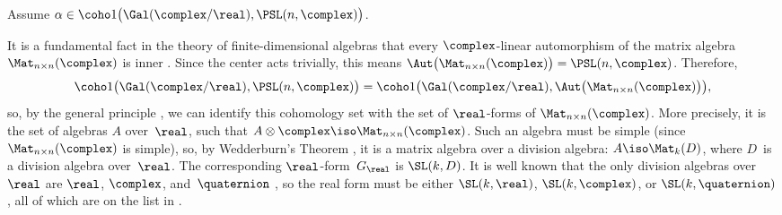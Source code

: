 \begin{case} \label{RFormFromCoho-innerCase}
Assume $\alpha \in \coho1\bigl( \Gal(\complex/\real), \PSL(n,\complex) \bigr)$. 
\end{case}
%
It is a fundamental fact in the theory of finite-dimensional algebras that every $\complex$-linear automorphism of the matrix algebra $\Mat_{n \times n}(\complex)$ is inner . Since the center acts trivially, this means $\Aut \bigl( \Mat_{n \times n}(\complex) \bigr) = \PSL(n,\complex)$. Therefore,  
	$$\coho1\bigl( \Gal(\complex/\real), \PSL(n,\complex) \bigr) = \coho1\bigl( \Gal(\complex/\real), \Aut \bigl( \Mat_{n \times n}(\complex) \bigr) \bigr) ,$$
	so, by the general principle , we can identify this cohomology set with the set of $\real$-forms of $\Mat_{n \times n}(\complex)$.  More precisely, it is the set of algebras $A$ over~$\real$, such that $A \otimes \complex \iso \Mat_{n \times n}(\complex)$. Such an algebra must be simple (since $\Mat_{n \times n}(\complex)$ is simple), so, by {Wedderburn's Theorem} , it is a matrix algebra over a division algebra: $A \iso \Mat_k (D)$, where $D$~is a division algebra over~$\real$. 
The corresponding $\real$-form~$G_\real$ is $\SL(k, D)$. It is well known that the only division algebras over~$\real$ are $\real$, $\complex$, and~$\quaternion$ , so the real form must be either $\SL(k,\real)$, $\SL(k,\complex)$, or $\SL(k,\quaternion)$, all of which are on the list in .

